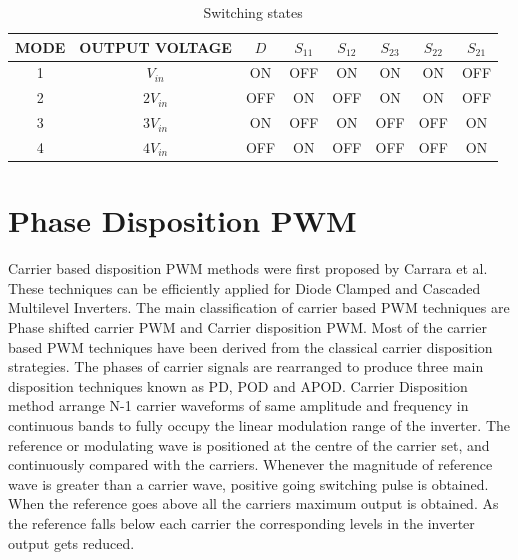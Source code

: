\documentclass[12pt,a4paper]{report}
\begin{document}
\begin{table}[H]
\begin{center}
	\begin{tabular}{|c|c|c|c|c|c|c|c|} 
		\hline
		{\bf MODE} & {\bf OUTPUT VOLTAGE} & {\bf $D$} & {\bf $S_{11}$} & {\bf $S_{12}$} & {\bf $S_{23}$} & {\bf $S_{22}$} & {\bf $S_{21}$} \\  
		\hline
		1 & $V_{in}$  & ON  & OFF & ON  & ON  & ON  & OFF \\ 
		\hline
		2 & $2V_{in}$ & OFF & ON  & OFF & ON  & ON  & OFF \\
		\hline
		3 & $3V_{in}$ & ON  & OFF & ON  & OFF & OFF & ON \\
		\hline
		4 & $4V_{in}$ & OFF & ON  & OFF & OFF & OFF & ON \\
		\hline
	\end{tabular}
\end{center}
\caption{Switching states}
\label{SS}
\end{table}

\section{Phase Disposition PWM}

Carrier based disposition PWM methods were first proposed by Carrara et al. These techniques can be efficiently applied for Diode Clamped and Cascaded Multilevel Inverters. The main classification of carrier based PWM techniques are Phase shifted carrier PWM and Carrier disposition PWM. Most of the carrier based PWM techniques have been derived from the classical carrier disposition strategies. The phases of carrier signals are rearranged to produce three main disposition techniques known as PD, POD and APOD. Carrier Disposition method arrange N-1 carrier waveforms of same amplitude and frequency in continuous bands to fully occupy the linear modulation range of the inverter. The reference or modulating wave is positioned at the centre of the carrier set, and continuously compared with the carriers. Whenever the magnitude of reference wave is greater than a carrier wave, positive going switching pulse is obtained. When the reference goes above all the carriers maximum output is obtained. As the reference falls below each carrier the corresponding levels in the inverter output gets reduced.\\
\end{document}
